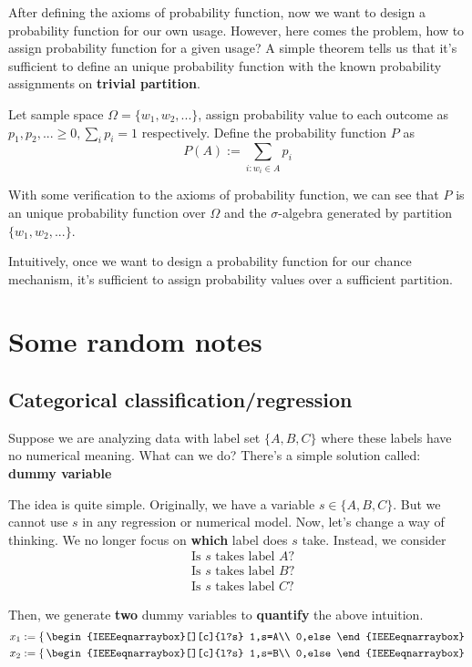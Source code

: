 \documentclass[11pt]{report}
\begin{document}
After defining the axioms of probability function, now we want to design a probability function for our own usage. However, here comes the problem, how to assign probability function for a given usage? A simple theorem tells us that it's sufficient to define an unique probability function with the known probability assignments on {\bf trivial partition}.
\begin{theorem}
	Let sample space $\Omega=\{w_1,w_2,...\}$, assign probability value to each outcome as $p_1,p_2,...\geq0, \sum_i p_i=1$ respectively. Define the probability function $P$ as
	$$P(A):=\sum_{i:w_i\in A}p_i$$
\end{theorem}
With some verification to the axioms of probability function, we can see that $P$ is an unique probability function over $\Omega$ and the $\sigma$-algebra generated by partition $\{w_1,w_2,...\}$.

Intuitively, once we want to design a probability function for our chance mechanism, it's sufficient to assign probability values over a sufficient partition.

\section{Some random notes}

\subsection{Categorical classification/regression}
Suppose we are analyzing data with label set $\{A,B,C\}$ where these labels have no numerical meaning. What can we do? There's a simple solution called: {\bf dummy variable}

The idea is quite simple. Originally, we have a variable $s\in\{A,B,C\}$. But we cannot use $s$ in any regression or numerical model. Now, let's change a way of thinking. We no longer focus on {\bf which } label does $s$ take. Instead, we consider
\begin{align*}
&\mbox{Is $s$ takes label $A$?}\\
&\mbox{Is $s$ takes label $B$?}\\
&\mbox{Is $s$ takes label $C$?}
\end{align*}

Then, we generate {\bf two} dummy variables to {\bf quantify} the above intuition.
\begin{align*}
&x_1:=\left\{ \,
	\begin{IEEEeqnarraybox}[][c]{l?s}
	1,s=A\\
	0,else
	\end{IEEEeqnarraybox}
	\right.\\
&x_2:=\left\{ \,
\begin{IEEEeqnarraybox}[][c]{l?s}
1,s=B\\
0,else
\end{IEEEeqnarraybox}
\right.
\end{align*}
\end{document}
